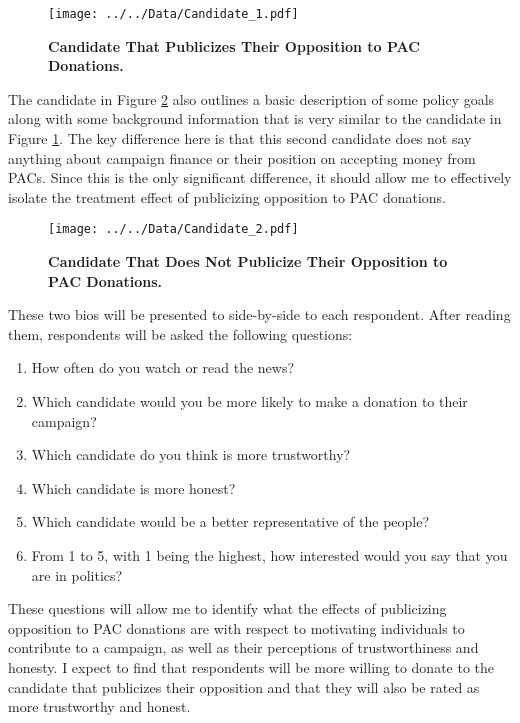 \documentclass[12pt]{article}
\begin{document}
\begin{figure}[ht]
    \centering
    \texttt{[image: ../../Data/Candidate\_1.pdf]}
    \caption{\textbf{Candidate That Publicizes Their Opposition to PAC Donations.}}
    \label{fig: pac candidate}
\end{figure} 

The candidate in Figure \ref{fig: control candidate} also outlines a basic description of some policy goals along with some background information that is very similar to the candidate in Figure \ref{fig: pac candidate}. The key difference here is that this second candidate does not say anything about campaign finance or their position on accepting money from PACs. Since this is the only significant difference, it should allow me to effectively isolate the treatment effect of publicizing opposition to PAC donations. 

\begin{figure}[ht]
    \centering
    \texttt{[image: ../../Data/Candidate\_2.pdf]}
    \caption{\textbf{Candidate That Does Not Publicize Their Opposition to PAC Donations.}}
    \label{fig: control candidate}
\end{figure} 

These two bios will be presented to side-by-side to each respondent. After reading them, respondents will be asked the following questions:

\begin{enumerate}
    \item How often do you watch or read the news?
    \item Which candidate would you be more likely to make a donation to their campaign? 
    \item Which candidate do you think is more trustworthy?
    \item Which candidate is more honest?
    \item Which candidate would be a better representative of the people?
    \item From 1 to 5, with 1 being the highest, how interested would you say that you are in politics?
\end{enumerate} 

These questions will allow me to identify what the effects of publicizing opposition to PAC donations are with respect to motivating individuals to contribute to a campaign, as well as their perceptions of trustworthiness and honesty. I expect to find that respondents will be more willing to donate to the candidate that publicizes their opposition and that they will also be rated as more trustworthy and honest. 
\end{document}
